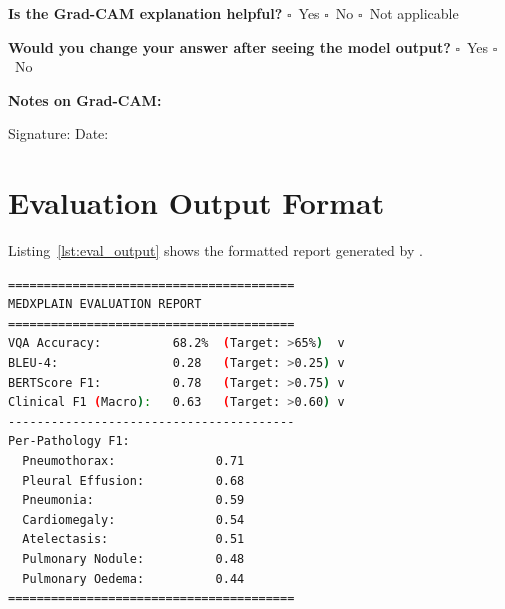 \begin{mdframed}
\textbf{Is the Grad-CAM explanation helpful?}
\quad $\square$~Yes \quad $\square$~No \quad $\square$~Not applicable

\textbf{Would you change your answer after seeing the model output?}
\quad $\square$~Yes \quad $\square$~No

\vspace{3mm}
\textbf{Notes on Grad-CAM:}\\
\underline{\hspace{12cm}}

\vspace{5mm}
Signature: \underline{\hspace{5cm}} \quad Date: \underline{\hspace{3cm}}
\end{mdframed}

\chapter{Evaluation Output Format}
\label{app:eval_output}

Listing~\ref{lst:eval_output} shows the formatted report generated by
.

\begin{lstlisting}[language=bash,
                   caption={Example output of the evaluation suite.},
                   label={lst:eval_output}]
========================================
MEDXPLAIN EVALUATION REPORT
========================================
VQA Accuracy:          68.2%  (Target: >65%)  v
BLEU-4:                0.28   (Target: >0.25) v
BERTScore F1:          0.78   (Target: >0.75) v
Clinical F1 (Macro):   0.63   (Target: >0.60) v
----------------------------------------
Per-Pathology F1:
  Pneumothorax:              0.71
  Pleural Effusion:          0.68
  Pneumonia:                 0.59
  Cardiomegaly:              0.54
  Atelectasis:               0.51
  Pulmonary Nodule:          0.48
  Pulmonary Oedema:          0.44
========================================
\end{lstlisting}
